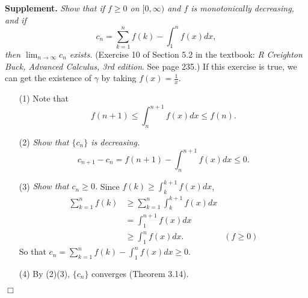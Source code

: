 \documentclass{article}
\begin{document}
\textbf{Supplement.}
  \emph{Show that if $f \geq 0$ on $[0,\infty)$ and $f$ is monotonically decreasing,
  and if $$c_n = \sum_{k=1}^{n} f(k) - \int_{1}^{n} f(x) dx,$$
  then $\lim_{n \to \infty} c_n$ exists.}
  (Exercise 10 of Section 5.2 in the textbook:
  \emph{R Creighton Buck, Advanced Calculus, 3rd edition}. See page 235.)
  If this exercise is true,
  we can get the existence of $\gamma$ by taking $f(x) = \frac{1}{x}$.
  \begin{enumerate}
    \item[(1)]
    Note that
    \[
       f(n+1)
      \leq \int_{n}^{n+1} f(x) dx
      \leq f(n).
    \]

    \item[(2)]
    \emph{Show that $\{c_n\}$ is decreasing.}
    \[
      c_{n+1} - c_n
      = f(n+1) - \int_{n}^{n+1} f(x)dx
      \leq 0.
    \]

    \item[(3)]
    \emph{Show that $c_n \geq 0$.}
    Since $f(k) \geq \int_{k}^{k+1} f(x) dx$,
    \begin{align*}
      \sum_{k=1}^{n} f(k)
      &\geq \sum_{k=1}^{n} \int_{k}^{k+1} f(x) dx \\
      &= \int_{1}^{n+1} f(x) dx \\
      &\geq \int_{1}^{n} f(x) dx.
        &(f \geq 0)
    \end{align*}
    So that $c_n = \sum_{k=1}^{n} f(k) - \int_{1}^{n} f(x) dx \geq 0$.

    \item[(4)]
    By (2)(3), $\{c_n\}$ converges (Theorem 3.14).
  \end{enumerate}
  $\Box$ \\
\end{document}
